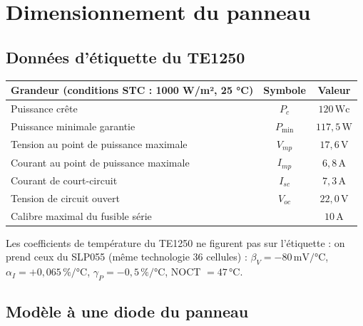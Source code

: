 \documentclass[11pt,a4paper]{article}
\newcommand{\U}[1]{\,\mathrm{#1}}
\begin{document}
\newpage
\section{Dimensionnement du panneau}
\label{sec:panneau}

\subsection{Données d'étiquette du TE1250}

\begin{center}
\begin{tabular}{l c c}
\toprule
\textbf{Grandeur (conditions STC : 1000 W/m², 25 °C)} & \textbf{Symbole} & \textbf{Valeur} \\
\midrule
Puissance crête & $P_c$ & $120\U{Wc}$ \\
Puissance minimale garantie & $P_{\min}$ & $117{,}5\U{W}$ \\
Tension au point de puissance maximale & $V_{mp}$ & $17{,}6\U{V}$ \\
Courant au point de puissance maximale & $I_{mp}$ & $6{,}8\U{A}$ \\
Courant de court-circuit & $I_{sc}$ & $7{,}3\U{A}$ \\
Tension de circuit ouvert & $V_{oc}$ & $22{,}0\U{V}$ \\
Calibre maximal du fusible série & & $10\U{A}$ \\
\bottomrule
\end{tabular}
\end{center}

Les coefficients de température du TE1250 ne figurent pas sur l'étiquette : on prend ceux du SLP055 (même technologie 36 cellules) : $\beta_{V} = -80\U{mV/°C}$, $\alpha_{I} = +0{,}065\U{\%/°C}$, $\gamma_P = -0{,}5\U{\%/°C}$, NOCT $= 47\U{°C}$.

\subsection{Modèle à une diode du panneau}
\end{document}

